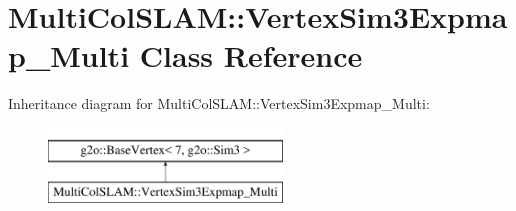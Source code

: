 \hypertarget{classMultiColSLAM_1_1VertexSim3Expmap__Multi}{}\section{Multi\+Col\+S\+L\+AM\+:\+:Vertex\+Sim3\+Expmap\+\_\+\+Multi Class Reference}
\label{classMultiColSLAM_1_1VertexSim3Expmap__Multi}
Inheritance diagram for Multi\+Col\+S\+L\+AM\+:\+:Vertex\+Sim3\+Expmap\+\_\+\+Multi\+:\begin{figure}[H]
\begin{center}
\leavevmode
\includegraphics[height=2.000000cm]{classMultiColSLAM_1_1VertexSim3Expmap__Multi}
\end{center}
\end{figure}
